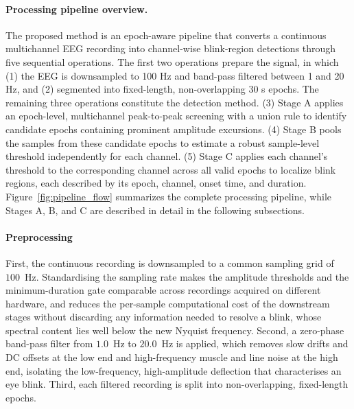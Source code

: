 \paragraph{Processing pipeline overview.}
\label{sec:pipeline_overview}

The proposed method is an epoch-aware pipeline that converts a continuous multichannel EEG recording into channel-wise blink-region detections through five sequential operations. The first two operations prepare the signal, in which (1) the EEG is downsampled to 100 Hz and band-pass filtered between 1 and 20 Hz, and (2) segmented into fixed-length, non-overlapping 30 s epochs. The remaining three operations constitute the detection method. (3) Stage A applies an epoch-level, multichannel peak-to-peak screening with a union rule to identify candidate epochs containing prominent amplitude excursions. (4) Stage B pools the samples from these candidate epochs to estimate a robust sample-level threshold independently for each channel. (5) Stage C applies each channel's threshold to the corresponding channel across all valid epochs to localize blink regions, each described by its epoch, channel, onset time, and duration. Figure~\ref{fig:pipeline_flow} summarizes the complete processing pipeline, while Stages A, B, and C are described in detail in the following subsections.




\paragraph{Preprocessing}
First, the continuous recording is downsampled to a common sampling grid of \(100\)~Hz. Standardising the sampling rate makes the
amplitude thresholds and the minimum-duration gate comparable across recordings acquired on different hardware, and reduces the per-sample computational cost of the downstream stages without discarding any information needed to resolve a blink, whose
spectral content lies well below the new Nyquist frequency.
%
Second, a zero-phase band-pass filter from \(1.0\)~Hz  to \(20.0\)~Hz
is applied, which removes slow drifts and DC offsets at the low end and high-frequency muscle and line noise at the high end, isolating the low-frequency, high-amplitude deflection that characterises an eye blink.
%
Third, each filtered recording is split into non-overlapping, fixed-length epochs.



